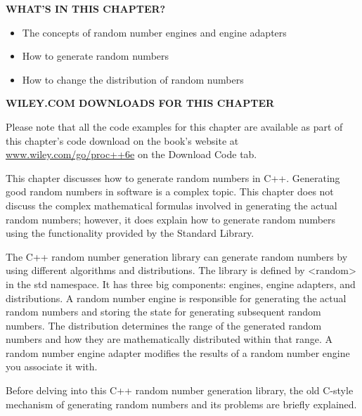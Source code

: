 \noindent
\textbf{WHAT’S IN THIS CHAPTER?}

\begin{itemize}
\item
The concepts of random number engines and engine adapters

\item
How to generate random numbers

\item
How to change the distribution of random numbers
\end{itemize}

\noindent
\textbf{WILEY.COM DOWNLOADS FOR THIS CHAPTER}

Please note that all the code examples for this chapter are available as part of this chapter’s code download on the book’s website at \url{www.wiley.com/go/proc++6e} on the Download Code tab.

This chapter discusses how to generate random numbers in C++. Generating good random numbers in software is a complex topic. This chapter does not discuss the complex mathematical formulas involved in generating the actual random numbers; however, it does explain how to generate random numbers using the functionality provided by the Standard Library.

The C++ random number generation library can generate random numbers by using different algorithms and distributions. The library is defined by <random> in the std namespace. It has three big components: engines, engine adapters, and distributions. A random number engine is responsible for generating the actual random numbers and storing the state for generating subsequent random numbers. The distribution determines the range of the generated random numbers and how they are mathematically distributed within that range. A random number engine adapter modifies the results of a random number engine you associate it with.

Before delving into this C++ random number generation library, the old C-style mechanism of generating random numbers and its problems are briefly explained.









